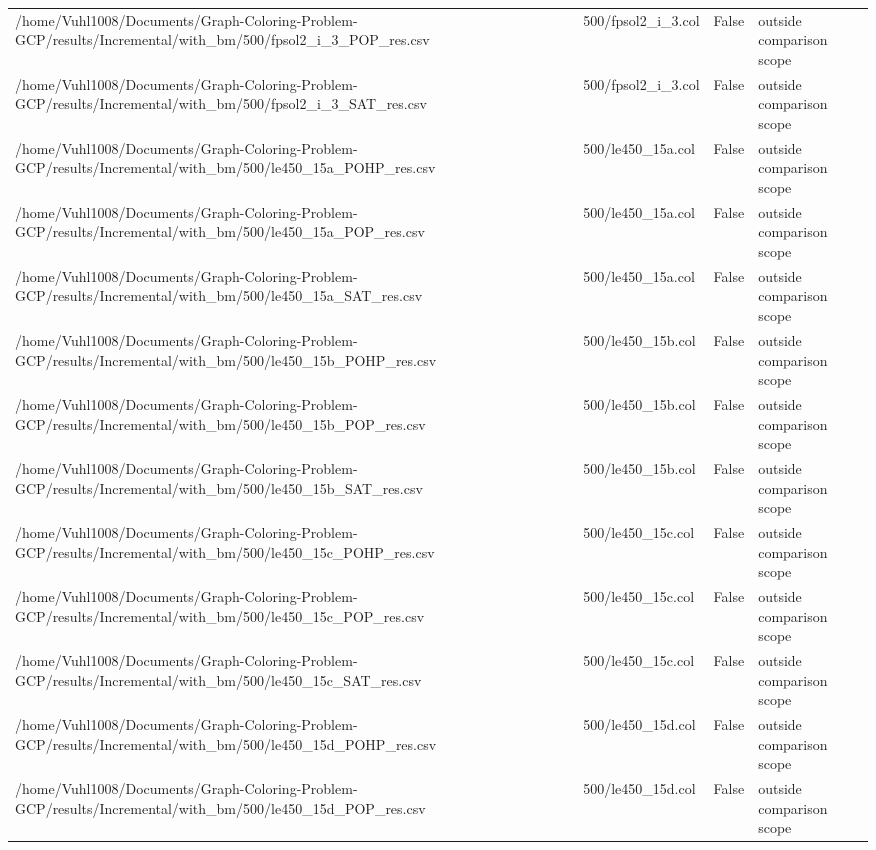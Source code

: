 \begin{table}[htbp]
\begin{tabular}{llll}
/home/Vuhl1008/Documents/Graph-Coloring-Problem-GCP/results/Incremental/with\_bm/500/fpsol2\_i\_3\_POP\_res.csv & 500/fpsol2\_i\_3.col & False & outside comparison scope \\
/home/Vuhl1008/Documents/Graph-Coloring-Problem-GCP/results/Incremental/with\_bm/500/fpsol2\_i\_3\_SAT\_res.csv & 500/fpsol2\_i\_3.col & False & outside comparison scope \\
/home/Vuhl1008/Documents/Graph-Coloring-Problem-GCP/results/Incremental/with\_bm/500/le450\_15a\_POHP\_res.csv & 500/le450\_15a.col & False & outside comparison scope \\
/home/Vuhl1008/Documents/Graph-Coloring-Problem-GCP/results/Incremental/with\_bm/500/le450\_15a\_POP\_res.csv & 500/le450\_15a.col & False & outside comparison scope \\
/home/Vuhl1008/Documents/Graph-Coloring-Problem-GCP/results/Incremental/with\_bm/500/le450\_15a\_SAT\_res.csv & 500/le450\_15a.col & False & outside comparison scope \\
/home/Vuhl1008/Documents/Graph-Coloring-Problem-GCP/results/Incremental/with\_bm/500/le450\_15b\_POHP\_res.csv & 500/le450\_15b.col & False & outside comparison scope \\
/home/Vuhl1008/Documents/Graph-Coloring-Problem-GCP/results/Incremental/with\_bm/500/le450\_15b\_POP\_res.csv & 500/le450\_15b.col & False & outside comparison scope \\
/home/Vuhl1008/Documents/Graph-Coloring-Problem-GCP/results/Incremental/with\_bm/500/le450\_15b\_SAT\_res.csv & 500/le450\_15b.col & False & outside comparison scope \\
/home/Vuhl1008/Documents/Graph-Coloring-Problem-GCP/results/Incremental/with\_bm/500/le450\_15c\_POHP\_res.csv & 500/le450\_15c.col & False & outside comparison scope \\
/home/Vuhl1008/Documents/Graph-Coloring-Problem-GCP/results/Incremental/with\_bm/500/le450\_15c\_POP\_res.csv & 500/le450\_15c.col & False & outside comparison scope \\
/home/Vuhl1008/Documents/Graph-Coloring-Problem-GCP/results/Incremental/with\_bm/500/le450\_15c\_SAT\_res.csv & 500/le450\_15c.col & False & outside comparison scope \\
/home/Vuhl1008/Documents/Graph-Coloring-Problem-GCP/results/Incremental/with\_bm/500/le450\_15d\_POHP\_res.csv & 500/le450\_15d.col & False & outside comparison scope \\
/home/Vuhl1008/Documents/Graph-Coloring-Problem-GCP/results/Incremental/with\_bm/500/le450\_15d\_POP\_res.csv & 500/le450\_15d.col & False & outside comparison scope \\

\end{tabular}
\end{table}

